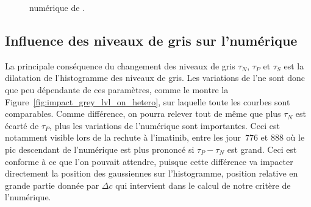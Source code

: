\documentclass[main.tex]{subfiles}
\begin{document}
\begin{figure}
\centering
{}
\caption{\label{fig:baisse_hetero_fin_simu} \Hetero numérique de \Nber. }
\end{figure}


\subsection{Influence des niveaux de gris sur l'\hetero numérique}
La principale conséquence du changement des niveaux de gris $\tau_N$, $\tau_P$ et $\tau_S$ est la dilatation de l'histogramme des niveaux de gris. Les variations de l'\hetero ne sont donc que peu dépendante de ces paramètres, comme le montre 
la Figure~\ref{fig:impact_grey_lvl_on_hetero}, sur laquelle toute les courbes sont comparables. Comme différence, on pourra relever tout de même que plus $\tau_N$ est écarté de $\tau_P$, plus les variations de l'\hetero numérique sont importantes. Ceci est notamment visible lors de la rechute à l'imatinib, entre les jour~776 et 888 où le pic descendant de l'\hetero numérique est plus prononcé si $\tau_P-\tau_N$ est grand. Ceci est conforme à ce que l'on pouvait attendre, puisque cette différence va impacter directement la position des gaussiennes sur l'histogramme, position relative en grande partie donnée par $\Delta c$ qui intervient dans le calcul de notre critère de l'\hetero numérique.
\end{document}
